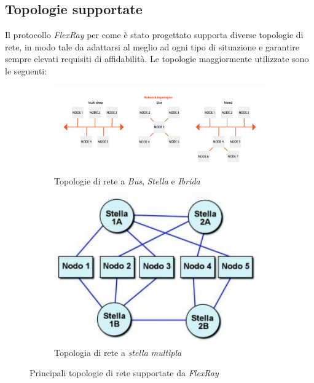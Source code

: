 \subsection{Topologie supportate}
Il protocollo \emph{FlexRay} per come è stato progettato supporta diverse topologie di rete, in modo tale da adattarsi al meglio ad ogni tipo di situazione e garantire sempre elevati requisiti di affidabilità. Le topologie maggiormente utilizzate sono le seguenti:

\begin{figure}[h]
    \centering
    \begin{subfigure}{0.8\textwidth}
        \includegraphics[width=1\textwidth]{capitoli/figure-protocolli/flexray-topologies.png}
        \caption{Topologie di rete a \emph{Bus}, \emph{Stella} e \emph{Ibrida}}
        \label{fig:flexray-topologies}
    \end{subfigure}
    \begin{subfigure}{0.5\textwidth}
        \vspace{0.3cm}
        \includegraphics[width=1\textwidth]{capitoli/figure-protocolli/flexray-multiple-star.jpg}
        \caption{Topologia di rete a \emph{stella multipla}}
        \label{fig:flexray-multiple-star}
    \end{subfigure}
    \caption{Principali topologie di rete supportate da \emph{FlexRay}}
    \label{fig:flexray-supported-topologies}
\end{figure}

